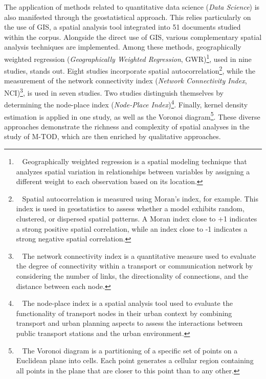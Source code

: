 \begin{refsegment}
The application of methods related to quantitative data science (\textsl{Data Science}) is also manifested through the geostatistical approach. This relies particularly on the use of \acrshort{GIS}, a spatial analysis tool integrated into 51 documents studied within the corpus. Alongside the direct use of \acrshort{GIS}, various complementary spatial analysis techniques are implemented. Among these methods, geographically weighted regression (\textsl{Geographically Weighted Regression}, GWR)\footnote{~
    Geographically weighted regression is a spatial modeling technique that analyzes spatial variation in relationships between variables by assigning a different weight to each observation based on its location.
}, used in nine studies, stands out. Eight studies incorporate spatial autocorrelation\footnote{~
    Spatial autocorrelation is measured using Moran's index, for example. This index is used in geostatistics to assess whether a model exhibits random, clustered, or dispersed spatial patterns. A Moran index close to +1 indicates a strong positive spatial correlation, while an index close to -1 indicates a strong negative spatial correlation.
}, while the measurement of the network connectivity index (\textsl{Network Connectivity Index}, NCI)\footnote{~
    The network connectivity index is a quantitative measure used to evaluate the degree of connectivity within a transport or communication network by considering the number of links, the directionality of connections, and the distance between each node.
}, is used in seven studies. Two studies distinguish themselves by determining the node-place index (\textsl{Node-Place Index})\footnote{~
    The node-place index is a spatial analysis tool used to evaluate the functionality of transport nodes in their urban context by combining transport and urban planning aspects to assess the interactions between public transport stations and the urban environment.
}. Finally, kernel density estimation is applied in one study, as well as the Voronoi diagram\footnote{~
    The Voronoi diagram is a partitioning of a specific set of points on a Euclidean plane into cells. Each point generates a cellular region containing all points in the plane that are closer to this point than to any other.
}. These diverse approaches demonstrate the richness and complexity of spatial analyses in the study of \acrshort{M-TOD}, which are then enriched by qualitative approaches.%


\end{refsegment}
